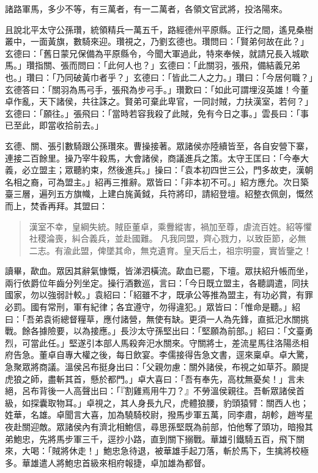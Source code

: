 諸路軍馬，多少不等，有三萬者，有一二萬者，各領文官武將，投洛陽來。

且說北平太守公孫瓚，統領精兵一萬五千，路經德州平原縣。正行之間，遙見桑樹叢中，一面黃旗，數騎來迎。瓚視之，乃劉玄德也。瓚問曰：「賢弟何故在此？」玄德曰：「舊日蒙兄保備為平原縣令，今聞大軍過此，特來奉候，就請兄長入城歇馬。」瓚指關、張而問曰：「此何人也？」玄德曰：「此關羽，張飛，備結義兄弟也。」瓚曰：「乃同破黃巾者乎？」玄德曰：「皆此二人之力。」瓚曰：「今居何職？」玄德答曰：「關羽為馬弓手，張飛為步弓手。」瓚歎曰：「如此可謂埋沒英雄！今董卓作亂，天下諸侯，共往誅之。賢弟可棄此卑官，一同討賊，力扶漢室，若何？」玄德曰：「願往。」張飛曰：「當時若容我殺了此賊，免有今日之事。」雲長曰：「事已至此，即當收拾前去。」

玄德、關、張引數騎跟公孫瓚來。曹操接著。眾諸侯亦陸續皆至，各自安營下寨，連接二百餘里。操乃宰牛殺馬，大會諸侯，商議進兵之策。太守王匡曰：「今奉大義，必立盟主；眾聽約束，然後進兵。」操曰：「袁本初四世三公，門多故吏，漢朝名相之裔，可為盟主。」紹再三推辭。眾皆曰：「非本初不可。」紹方應允。次日築臺三層，遍列五方旗幟，上建白旄黃鉞，兵符將印，請紹登壇。紹整衣佩劍，慨然而上，焚香再拜。其盟曰：

\begin{quote}
漢室不幸，皇綱失統。賊臣董卓，乘釁縱害，禍加至尊，虐流百姓。紹等懼社稷淪喪，糾合義兵，並赴國難。
凡我同盟，齊心戮力，以致臣節，必無二志。有渝此盟，俾墜其命，無克遺育。皇天后土，祖宗明靈，實皆鑒之！
\end{quote}

讀畢，歃血。眾因其辭氣慷慨，皆涕泗橫流。歃血已罷，下壇。眾扶紹升帳而坐，兩行依爵位年齒分列坐定。操行酒數巡，言曰：「今日既立盟主，各聽調遣，同扶國家，勿以強弱計較。」袁紹曰：「紹雖不才，既承公等推為盟主，有功必賞，有罪必罰。國有常刑，軍有紀律；各宜遵守，勿得違犯。」眾皆曰：「惟命是聽。」紹曰：「吾弟袁術總督糧草，應付諸營，無使有缺。更須一人為先鋒，直抵汜水關挑戰。餘各據險要，以為接應。」長沙太守孫堅出曰：「堅願為前部。」紹曰：「文臺勇烈，可當此任。」堅遂引本部人馬殺奔汜水關來。守關將士，差流星馬往洛陽丞相府告急。董卓自專大權之後，每日飲宴。李儒接得告急文書，逕來稟卓。卓大驚，急聚眾將商議。溫侯呂布挺身出曰：「父親勿慮：關外諸侯，布視之如草芥。願提虎狼之師，盡斬其首，懸於都門。」卓大喜曰：「吾有奉先，高枕無憂矣！」言未絕，呂布背後一人高聲出曰：「『割雞焉用牛刀？』不勞溫侯親往。吾斬眾諸侯首級，如探囊取物耳。」卓視之，其人身長九尺，虎體狼腰，豹頭猿臂：關西人也；姓華，名雄。卓聞言大喜，加為驍騎校尉，撥馬步軍五萬，同李肅，胡軫，趙岑星夜赴關迎敵。眾諸侯內有濟北相鮑信，尋思孫堅既為前部，怕他奪了頭功，暗撥其弟鮑忠，先將馬步軍三千，逕抄小路，直到關下搦戰。華雄引鐵騎五百，飛下關來，大喝：「賊將休走！」鮑忠急待退，被華雄手起刀落，斬於馬下，生擒將校極多。華雄遣人將鮑忠首級來相府報捷，卓加雄為都督。


